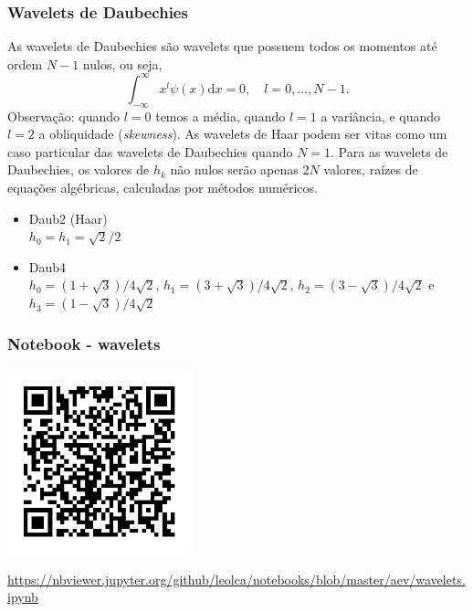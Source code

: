 \begin{frame}[allowframebreaks]
  \frametitle{Wavelets de Daubechies}
  As wavelets de Daubechies são wavelets que possuem todos os momentos
  até ordem $N-1$ nulos, ou seja,
  \begin{equation}
        \int_{-\infty}^{\infty} x^l \psi(x) \mathrm{d}x = 0 , \quad l = 0, \ldots, N-1.
  \end{equation}
  Observação: quando $l=0$ temos a média, quando $l=1$ a variância, e quando $l=2$ a obliquidade (\emph{skewness}).
  As wavelets de Haar podem ser vitas como um caso particular das wavelets de 
  Daubechies quando $N=1$.
  Para as wavelets de Daubechies, os valores de $h_k$ não nulos serão apenas $2N$
  valores, raízes de equações algébricas, calculadas por métodos numéricos.
  
  \framebreak

  \begin{itemize}
        \item Daub2 (Haar) \\ $h_0 = h_1 = \sqrt{2}/2$ 
        \item Daub4 \\ $h_0 = (1+\sqrt{3})/4\sqrt{2}$, $h_1 = (3+\sqrt{3})/4\sqrt{2}$, $h_2 = (3-\sqrt{3})/4\sqrt{2}$ e $h_3 = (1-\sqrt{3})/4\sqrt{2}$
  \end{itemize}  

\end{frame}
 
\begin{frame}%
  \frametitle{Notebook - wavelets}
  \centering
  \includegraphics[width=0.4\textwidth]{images/qrcode-jupyter-wavelets.pdf}

  \url{https://nbviewer.jupyter.org/github/leolca/notebooks/blob/master/aev/wavelets.ipynb}
\end{frame} 


